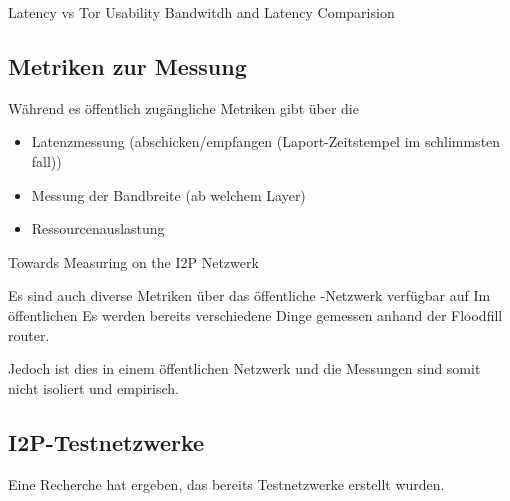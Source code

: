 Latency vs Tor Usability Bandwitdh and Latency Comparision
\cite{ehlert_i2p_2011}


\subsection{Metriken zur Messung}

Während es öffentlich zugängliche Metriken gibt über die 

\begin{itemize}
    \item Latenzmessung (abschicken/empfangen (Laport-Zeitstempel im schlimmsten fall))
    \item Messung der Bandbreite (ab welchem Layer)
    \item Ressourcenauslastung
\end{itemize}

Towards Measuring on the I2P Netzwerk
\cite{wang_towards_2013}


Es sind auch diverse Metriken über das öffentliche -Netzwerk verfügbar auf
Im öffentlichen  Es werden bereits verschiedene Dinge gemessen anhand der Floodfill router.

Jedoch ist dies in einem öffentlichen Netzwerk und die Messungen sind somit nicht isoliert und empirisch.


\cite{timpanaro_monitoring_nodate}

%
%

\subsection{I2P-Testnetzwerke}

Eine Recherche hat ergeben, das bereits Testnetzwerke erstellt wurden.

